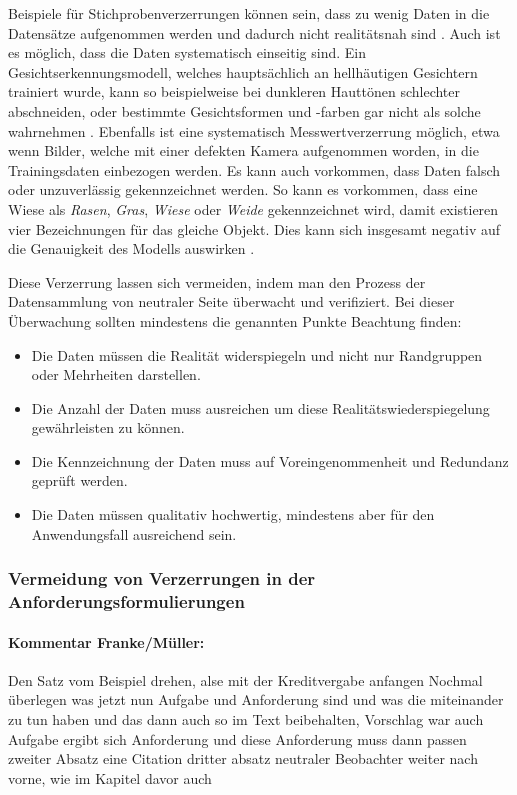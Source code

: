 \documentclass[12pt]{article}
\begin{document}
Beispiele für Stichprobenverzerrungen können sein, dass zu wenig Daten in die Datensätze aufgenommen werden und dadurch nicht realitätsnah sind \cite{Srinivasan}.
Auch ist es möglich, dass die Daten systematisch einseitig sind. Ein Gesichtserkennungsmodell, welches hauptsächlich an hellhäutigen Gesichtern trainiert wurde,
kann so beispielweise bei dunkleren Hauttönen schlechter abschneiden, oder bestimmte Gesichtsformen und -farben gar nicht als solche wahrnehmen \cite{Srinivasan}.
Ebenfalls ist eine systematisch Messwertverzerrung möglich, etwa wenn Bilder, welche mit einer defekten Kamera aufgenommen worden, in die Trainingsdaten einbezogen werden.
Es kann auch vorkommen, dass Daten falsch oder unzuverlässig gekennzeichnet werden. So kann es vorkommen, dass eine Wiese als \textit{Rasen}, \textit{Gras}, \textit{Wiese} oder \textit{Weide} gekennzeichnet wird, damit existieren vier Bezeichnungen für das gleiche Objekt. Dies kann sich insgesamt negativ auf die Genauigkeit des Modells auswirken \cite{Srinivasan}.

Diese Verzerrung lassen sich vermeiden, indem man den Prozess der Datensammlung von neutraler Seite überwacht und verifiziert.
Bei dieser Überwachung sollten mindestens die genannten Punkte Beachtung finden: 
\begin{itemize}
    \item Die Daten müssen die Realität widerspiegeln und nicht nur Randgruppen oder Mehrheiten darstellen.
    \item Die Anzahl der Daten muss ausreichen um diese Realitätswiederspiegelung gewährleisten zu können.
    \item Die Kennzeichnung der Daten muss auf Voreingenommenheit und Redundanz geprüft werden.
    \item Die Daten müssen qualitativ hochwertig, mindestens aber für den Anwendungsfall ausreichend sein.
\end{itemize}

\subsubsection{Vermeidung von Verzerrungen in der Anforderungsformulierungen}
\paragraph{Kommentar Franke/Müller:}
Den Satz vom Beispiel drehen, alse mit der Kreditvergabe anfangen
Nochmal überlegen was jetzt nun Aufgabe und Anforderung sind und was die miteinander zu tun haben und das dann auch so im Text beibehalten, Vorschlag war auch Aufgabe ergibt sich Anforderung und diese Anforderung muss dann passen
zweiter Absatz eine Citation
dritter absatz neutraler Beobachter weiter nach vorne, wie im Kapitel davor auch
\end{document}
